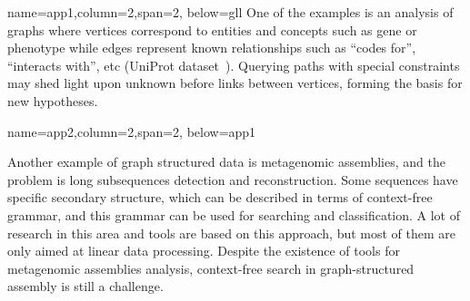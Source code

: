 \documentclass[a0paper,portrait]{baposter}
\begin{document}
\begin{poster}



{name=app1,column=2,span=2, below=gll}
{ %
One of the examples is an analysis of graphs where vertices correspond to entities and concepts such as gene or phenotype while edges represent known relationships such as ``codes for'', ``interacts with'', etc (UniProt dataset~\cite{UniProt}).
Querying paths with special constraints may shed light upon unknown before links between vertices, forming the basis for new hypotheses.
}


{name=app2,column=2,span=2, below=app1}
{
Another example of graph structured data is metagenomic assemblies, and the problem is long subsequences detection and reconstruction.
Some sequences have specific secondary structure, which can be described in terms of context-free grammar, and this grammar can be used for searching and classification.
A lot of research in this area and tools are based on this approach, but most of them are only aimed at linear data processing.
Despite the existence of tools for metagenomic assemblies analysis, context-free search in graph-structured assembly is still a challenge.

}
\end{poster}
\end{document}
